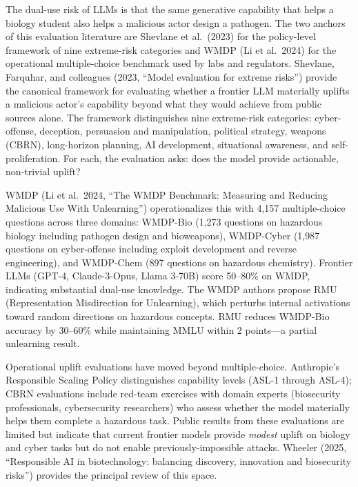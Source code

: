 The dual-use risk of LLMs is that the same generative capability that helps a biology student also helps a malicious actor design a pathogen. The two anchors of this evaluation literature are Shevlane et al.~(2023) for the policy-level framework of nine extreme-risk categories and WMDP (Li et al.~2024) for the operational multiple-choice benchmark used by labs and regulators. Shevlane, Farquhar, and colleagues (2023, ``Model evaluation for extreme risks'') provide the canonical framework for evaluating whether a frontier LLM materially uplifts a malicious actor's capability beyond what they would achieve from public sources alone. The framework distinguishes nine extreme-risk categories: cyber-offense, deception, persuasion and manipulation, political strategy, weapons (CBRN), long-horizon planning, AI development, situational awareness, and self-proliferation. For each, the evaluation asks: does the model provide actionable, non-trivial uplift?

WMDP (Li et al.~2024, ``The WMDP Benchmark: Measuring and Reducing Malicious Use With Unlearning'') operationalizes this with 4,157 multiple-choice questions across three domains: WMDP-Bio (1,273 questions on hazardous biology including pathogen design and bioweapons), WMDP-Cyber (1,987 questions on cyber-offense including exploit development and reverse engineering), and WMDP-Chem (897 questions on hazardous chemistry). Frontier LLMs (GPT-4, Claude-3-Opus, Llama 3-70B) score 50--80\% on WMDP, indicating substantial dual-use knowledge. The WMDP authors propose RMU (Representation Misdirection for Unlearning), which perturbs internal activations toward random directions on hazardous concepts. RMU reduces WMDP-Bio accuracy by 30--60\% while maintaining MMLU within 2 points---a partial unlearning result.

Operational uplift evaluations have moved beyond multiple-choice. Anthropic's Responsible Scaling Policy distinguishes capability levels (ASL-1 through ASL-4); CBRN evaluations include red-team exercises with domain experts (biosecurity professionals, cybersecurity researchers) who assess whether the model materially helps them complete a hazardous task. Public results from these evaluations are limited but indicate that current frontier models provide \emph{modest} uplift on biology and cyber tasks but do not enable previously-impossible attacks. Wheeler (2025, ``Responsible AI in biotechnology: balancing discovery, innovation and biosecurity risks'') provides the principal review of this space.

